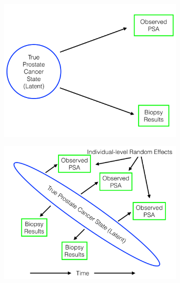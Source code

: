 \documentclass[12pt, letterpaper]{article}
\begin{document}
\begin{figure}
\begin{center}
\begin{subfigure}[b]{0.3\textwidth}
\includegraphics[width=\textwidth]{dag1}
\caption{}%
\label{fig:dag1}
\end{subfigure}
\begin{subfigure}[b]{0.3\textwidth}
\includegraphics[width=\textwidth]{dag2}
\caption{}%
\label{fig:dag2}
\end{subfigure}
\begin{subfigure}[b]{0.3\textwidth}

\end{subfigure}
\end{center}
\end{figure}
\end{document}
